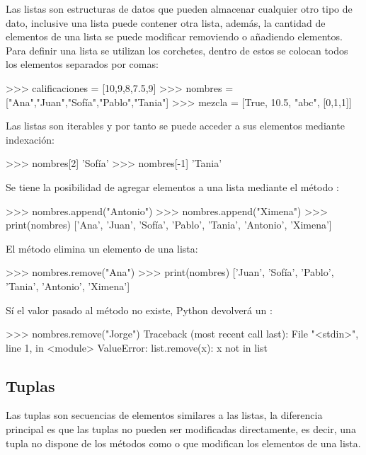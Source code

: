 Las listas son estructuras de datos que pueden almacenar cualquier otro tipo de dato, inclusive una lista 
puede contener otra lista, además, la cantidad de elementos de una lista se puede modificar removiendo o 
añadiendo elementos. Para definir una lista se utilizan los corchetes, dentro de estos se colocan todos 
los elementos separados por comas:

\begin{python}
>>> calificaciones = [10,9,8,7.5,9]
>>> nombres = ["Ana","Juan","Sofía","Pablo","Tania"]
>>> mezcla = [True, 10.5, "abc", [0,1,1]]
\end{python}

Las listas son iterables y por tanto se puede acceder a sus elementos mediante indexación:

\begin{python}
 >>> nombres[2]
'Sofía'
>>> nombres[-1]
'Tania'
\end{python}

Se tiene la posibilidad de agregar elementos a una lista mediante el método : 

\begin{python}
>>> nombres.append("Antonio")
>>> nombres.append("Ximena")
>>> print(nombres)
['Ana', 'Juan', 'Sofía', 'Pablo', 'Tania', 'Antonio', 'Ximena']	
\end{python}

El método  elimina un elemento de una lista:

\begin{python}
>>> nombres.remove("Ana")
>>> print(nombres)
['Juan', 'Sofía', 'Pablo', 'Tania', 'Antonio', 'Ximena'] 	
\end{python} 

Sí el valor pasado al método  no existe, Python devolverá un :

\begin{python}
>>> nombres.remove("Jorge")
Traceback (most recent call last):
  File "<stdin>", line 1, in <module>
ValueError: list.remove(x): x not in list
\end{python}



\subsection{Tuplas}

Las tuplas son secuencias de elementos similares a las listas, la diferencia principal es que 
las tuplas no pueden ser modificadas directamente, es decir, una tupla no dispone de los métodos 
como  o  que modifican los elementos de una lista.

